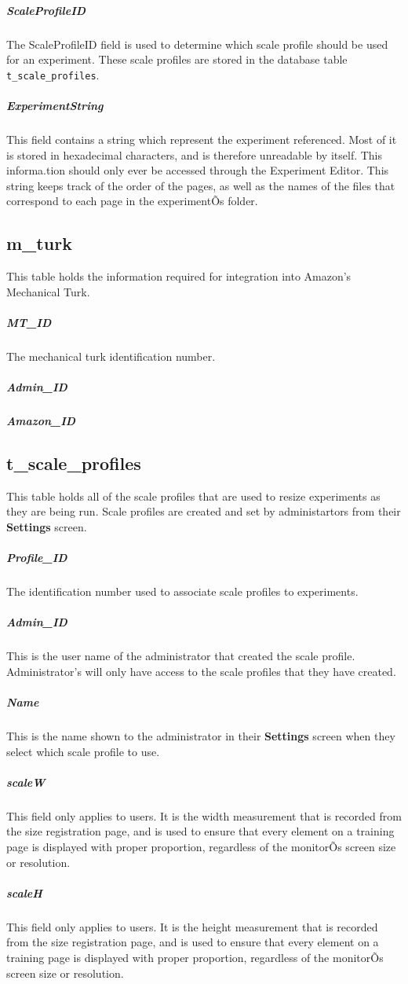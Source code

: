 \documentclass[article]{ij4uq}              %
\begin{document}
\subparagraph{ScaleProfileID}
The ScaleProfileID field is used to determine which scale profile should be used for an experiment.  These scale profiles are stored in the database table \texttt{t\_scale\_profiles}.

\subparagraph{ExperimentString}
This field contains a string which represent the experiment referenced. Most of it is stored in hexadecimal characters, and is therefore unreadable by itself. This informa.tion should only ever be accessed through the Experiment Editor. This string keeps track of the order of the pages, as well as the names of the files that correspond to each page in the experimentÕs folder. 


\subsection{m\_turk}
This table holds the information required for integration into Amazon's Mechanical Turk.

\subparagraph{MT\_ID}
The mechanical turk identification number.

\subparagraph{Admin\_ID}

\subparagraph{Amazon\_ID}


\subsection{t\_scale\_profiles}
This table holds all of the scale profiles that are used to resize experiments as they are being run.  Scale profiles are created and set by administartors from their \textbf{Settings} screen.

\subparagraph{Profile\_ID}
The identification number used to associate scale profiles to experiments.

\subparagraph{Admin\_ID}
This is the user name of the administrator that created the scale profile.  Administrator's will only have access to the scale profiles that they have created.

\subparagraph{Name}
This is the name shown to the administrator in their \textbf{Settings} screen when they select which scale profile to use.

\subparagraph{scaleW}
This field only applies to users. It is the width measurement that is recorded from the size registration page, and is used to ensure that every element on a training page is displayed with proper proportion, regardless of the monitorÕs screen size or resolution. 

\subparagraph{scaleH}
This field only applies to users. It is the height measurement that is recorded from the size registration page, and is used to ensure that every element on a training page is displayed with proper proportion, regardless of the monitorÕs screen size or resolution. 
\end{document}
